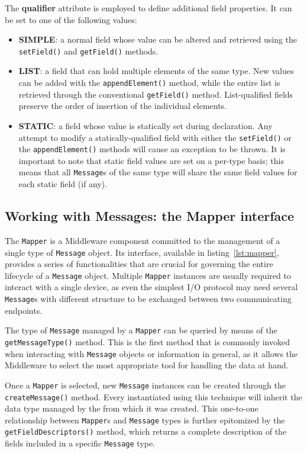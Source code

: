 The \textbf{qualifier} attribute is employed to define additional field
properties. It can be set to one of the following values:
\begin{itemize}
  \item \textbf{SIMPLE}: a normal field whose value can be altered and
  retrieved using the \texttt{setField()} and \texttt{getField()} methods.
  \item \textbf{LIST}: a field that can hold multiple elements of the same
  type. New values can be added with the \texttt{appendElement()} method, while
  the entire list is retrieved through the conventional \texttt{getField()}
  method. List-qualified fields preserve the order of insertion of the
  individual elements.
  \item \textbf{STATIC}: a field whose value is statically set during
  declaration.  Any attempt to modify a statically-qualified field with either
  the \texttt{setField()} or the \texttt{appendElement()} methods will cause an
  exception to be thrown. It is important to note that static field values are
  set on a per-type basis; this means that all \texttt{Message}s of the same
  type will share the same field values for each static field (if any). 
\end{itemize}


\subsection{Working with Messages: the Mapper interface}

The \texttt{Mapper} is a Middleware component committed to the management of a
single type of \texttt{Message} object. Its interface, available in
listing~\ref{lst:mapper}, provides a series of functionalities that are crucial
for governing the entire lifecycle of a \texttt{Message} object. Multiple
\texttt{Mapper} instances are usually required to interact with a single
device, as even the simplest I/O protocol may need several \texttt{Message}s
with different structure to be exchanged between two communicating endpoints.

The type of \texttt{Message} managed by a \texttt{Mapper} can be queried by
means of the \texttt{getMessageType()} method. This is the first method that is
commonly invoked when interacting with \texttt{Message} objects or information
in general, as it allows the Middleware to select the most appropriate tool for
handling the data at hand.

Once a \texttt{Mapper} is selected, new \texttt{Message} instances can be
created through the \texttt{createMessage()} method. Every 
instantiated using this technique will inherit the data type managed by the
 from which it was created. This one-to-one relationship between
\texttt{Mapper}s and \texttt{Message} types is further epitomized by the
\texttt{getFieldDescriptors()} method, which returns a complete description of
the fields included in a specific \texttt{Message} type.

